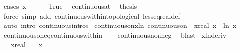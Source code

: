 \begin{isabellebody}
%
\isadelimproof
%
\endisadelimproof
%
\isatagproof
{}\isamarkupfalse%
\ {\isacharparenleft}{\kern0pt}cases\ {\isachardoublequoteopen}x\ {\isacharequal}{\kern0pt}\ {}{\isachardoublequoteclose}{\isacharparenright}{\kern0pt}\isanewline
\ \ \isamarkupfalse%
\ True\ \isamarkupfalse%
\ continuous{\isacharunderscore}{\kern0pt}at{\isacharunderscore}{\kern0pt}{}\ \isamarkupfalse%
\ {\isacharquery}{\kern0pt}thesis\isanewline
\ \ \ \ \isamarkupfalse%
\ {\isacharparenleft}{\kern0pt}force\ simp\ add{\isacharcolon}{\kern0pt}\ continuous{\isacharunderscore}{\kern0pt}within{\isacharunderscore}{\kern0pt}topological\ less{\isacharunderscore}{\kern0pt}eq{\isacharunderscore}{\kern0pt}real{\isacharunderscore}{\kern0pt}def{\isacharparenright}{\kern0pt}\isanewline
{}\isamarkupfalse%
\ {\isacharparenleft}{\kern0pt}auto\ intro{\isacharbang}{\kern0pt}{\isacharcolon}{\kern0pt}\ continuous{\isacharunderscore}{\kern0pt}intros{\isacharparenright}{\kern0pt}%
\endisatagproof
{\isafoldproof}%
%
\isadelimproof
\isanewline
%
\endisadelimproof
\isanewline
{}\isamarkupfalse%
\ continuous{\isacharunderscore}{\kern0pt}on{\isacharunderscore}{\kern0pt}x{\isacharunderscore}{\kern0pt}ln{\isacharcolon}{\kern0pt}\ {\isachardoublequoteopen}continuous{\isacharunderscore}{\kern0pt}on\ {\isacharbraceleft}{\kern0pt}{}{\isachardot}{\kern0pt}{\isachardot}{\kern0pt}{\isacharbraceright}{\kern0pt}\ {\isacharparenleft}{\kern0pt}{\isasymlambda}x{\isacharcolon}{\kern0pt}{\isacharcolon}{\kern0pt}real{\isachardot}{\kern0pt}\ x\ {\isacharasterisk}{\kern0pt}\ ln\ x{\isacharparenright}{\kern0pt}{\isachardoublequoteclose}\isanewline
%
\isadelimproof
\ \ %
\endisadelimproof
%
\isatagproof
{}\isamarkupfalse%
\ continuous{\isacharunderscore}{\kern0pt}on{\isacharunderscore}{\kern0pt}eq{\isacharunderscore}{\kern0pt}continuous{\isacharunderscore}{\kern0pt}within\isanewline
\ \ \isamarkupfalse%
\ continuous{\isacharunderscore}{\kern0pt}nonneg\ \isamarkupfalse%
\ blast%
\endisatagproof
{\isafoldproof}%
%
\isadelimproof
\isanewline
%
\endisadelimproof
\isanewline
{}\isamarkupfalse%
\ xln{\isacharunderscore}{\kern0pt}deriv{\isacharcolon}{\kern0pt}\isanewline
\ \ \ x{\isacharcolon}{\kern0pt}{\isacharcolon}{\kern0pt}real\isanewline
\ \ \ {\isachardoublequoteopen}x\ {\isachargreater}{\kern0pt}\ {}{\isachardoublequoteclose}\isanewline

\end{isabellebody}
